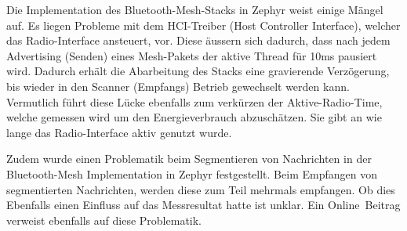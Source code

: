 Die Implementation des Bluetooth-Mesh-Stacks in Zephyr weist einige Mängel auf. Es liegen Probleme mit dem HCI-Treiber (Host Controller Interface), welcher das Radio-Interface ansteuert, vor. Diese äussern sich dadurch, dass nach jedem Advertising (Senden) eines Mesh-Pakets  der aktive Thread für 10ms pausiert wird. Dadurch erhält die Abarbeitung des Stacks eine gravierende Verzögerung, bis wieder in den Scanner (Empfangs) Betrieb gewechselt werden kann. Vermutlich führt diese Lücke ebenfalls zum verkürzen der Aktive-Radio-Time, welche gemessen wird um den Energieverbrauch abzuschätzen. Sie gibt an wie lange das Radio-Interface aktiv genutzt wurde. 

Zudem wurde einen Problematik beim Segmentieren von Nachrichten in der Bluetooth-Mesh Implementation in Zephyr festgestellt. Beim Empfangen von segmentierten Nachrichten, werden diese zum Teil mehrmals empfangen. Ob dies Ebenfalls einen Einfluss auf das Messresultat hatte ist unklar. Ein Online\footnotemark\ Beitrag verweist ebenfalls auf diese Problematik. 



